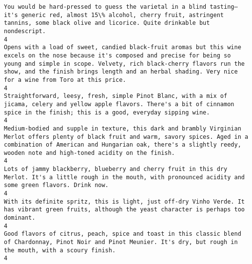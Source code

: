 \documentclass[11pt]{article}
\begin{document}
\begin{Verbatim}[commandchars=\\\{\}]
You would be hard-pressed to guess the varietal in a blind tasting—it's generic red, almost 15\% alcohol, cherry fruit, astringent tannins, some black olive and licorice. Quite drinkable but nondescript.                                                                                                                                                                                                     4
Opens with a load of sweet, candied black-fruit aromas but this wine excels on the nose because it's composed and precise for being so young and simple in scope. Velvety, rich black-cherry flavors run the show, and the finish brings length and an herbal shading. Very nice for a wine from Toro at this price.                                                                                           4
Straightforward, leesy, fresh, simple Pinot Blanc, with a mix of jicama, celery and yellow apple flavors. There's a bit of cinnamon spice in the finish; this is a good, everyday sipping wine.                                                                                                                                                                                                                4
Medium-bodied and supple in texture, this dark and brambly Virginian Merlot offers plenty of black fruit and warm, savory spices. Aged in a combination of American and Hungarian oak, there's a slightly reedy, wooden note and high-toned acidity on the finish.                                                                                                                                             4
Lots of jammy blackberry, blueberry and cherry fruit in this dry Merlot. It's a little rough in the mouth, with pronounced acidity and some green flavors. Drink now.                                                                                                                                                                                                                                          4
With its definite spritz, this is light, just off-dry Vinho Verde. It has vibrant green fruits, although the yeast character is perhaps too dominant.                                                                                                                                                                                                                                                          4
Good flavors of citrus, peach, spice and toast in this classic blend of Chardonnay, Pinot Noir and Pinot Meunier. It's dry, but rough in the mouth, with a scoury finish.                                                                                                                                                                                                                                      4

\end{Verbatim}
\end{document}
